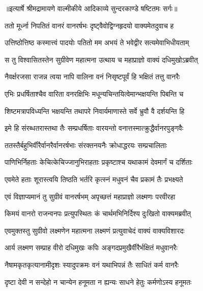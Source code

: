 {॥इत्यार्षे श्रीमद्रामायणे वाल्मीकीये आदिकाव्ये सुन्दरकाण्डे षष्टितमः सर्गः॥}


\twolineshloka
{ततो मूर्ध्ना निपतितं वानरं वानरर्षभः}
{दृष्ट्वैवोद्विग्नहृदयो वाक्यमेतदुवाच ह} %

\twolineshloka
{उत्तिष्ठोत्तिष्ठ कस्मात्त्वं पादयोः पतितो मम}
{अभयं ते भवेद्वीर सत्यमेवाभिधीयताम्} %

\twolineshloka
{स तु विश्वासितस्तेन सुग्रीवेण महात्मना}
{उत्थाय च महाप्राज्ञो वाक्यं दधिमुखोऽब्रवीत्} %

\twolineshloka
{नैवर्क्षरजसा राजन्न त्वया नापि वालिना}
{वनं निसृष्टपूर्वं हि भक्षितं तत्तु वानरैः} %

\twolineshloka
{एभिः प्रधर्षिताश्चैव वारिता वनरक्षिभिः}
{मधून्यचिन्तयित्वेमान्भक्षयन्ति पिबन्ति च} %

\twolineshloka
{शिष्टमत्रापविध्यन्ति भक्षयन्ति तथापरे}
{निवार्यमाणास्ते सर्वे भ्रुवौ वै दर्शयन्ति हि} %

\twolineshloka
{इमे हि संरब्धतरास्तथा तैः सम्प्रधर्षिताः}
{वारयन्तो वनात्तस्मात्क्रुद्धैर्वानरपुङ्गवैः} %

\twolineshloka
{ततस्तैर्बहुभिर्वीरैर्वानरैर्वानरर्षभाः}
{संरक्तनयनैः क्रोधाद्धरयः सम्प्रचालिताः} %

\twolineshloka
{पाणिभिर्निहताः केचित्केचिज्जानुभिराहताः}
{प्रकृष्टाश्च यथाकामं देवमार्गं च दर्शिताः} %

\twolineshloka
{एवमेते हताः शूरास्त्वयि तिष्ठति भर्तरि}
{कृत्स्नं मधुवनं चैव प्रकामं तैः प्रभक्ष्यते} %

\twolineshloka
{एवं विज्ञाप्यमानं तु सुग्रीवं वानरर्षभम्}
{अपृच्छत्तं महाप्राज्ञो लक्ष्मणः परवीरहा} %

\twolineshloka
{किमयं वानरो राजन्वनपः प्रत्युपस्थितः}
{कं चार्थमभिनिर्दिश्य दुःखितो वाक्यमब्रवीत्} %

\twolineshloka
{एवमुक्तस्तु सुग्रीवो लक्ष्मणेन महात्मना}
{लक्ष्मणं प्रत्युवाचेदं वाक्यं वाक्यविशारदः} %

\twolineshloka
{आर्य लक्ष्मण सम्प्राह वीरो दधिमुखः कपिः}
{अङ्गदप्रमुखैर्वीरैर्भक्षितं मधुवानरैः} %

\twolineshloka
{नैषामकृतकृत्यानामीदृशः स्यादुपक्रमः}
{वनं यथाभिपन्नं तैः साधितं कर्म वानरैः} %

\twolineshloka
{दृष्टा देवी न सन्देहो न चान्येन हनूमता}
{न ह्यन्यः साधने हेतुः कर्मणोऽस्य हनूमतः} %

